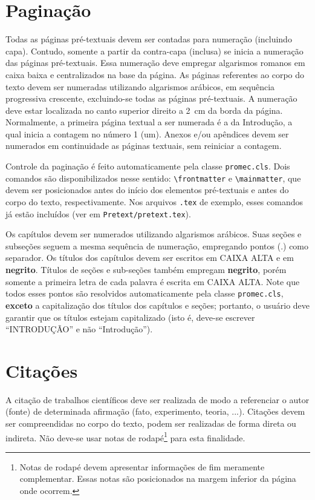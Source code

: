 \section{Paginação}
Todas as páginas pré-textuais devem ser contadas para numeração (incluindo capa). Contudo, somente a partir da contra-capa (inclusa) se inicia a numeração das páginas pré-textuais. Essa numeração deve empregar algarismos romanos em caixa baixa e centralizados na base da página. As páginas referentes ao corpo do texto devem ser numeradas utilizando algarismos arábicos, em sequência progressiva crescente, excluindo-se todas as páginas pré-textuais. A numeração deve estar localizada no canto superior direito a \SI{2}{\centi\meter} da borda da página. Normalmente, a primeira página textual a ser numerada é a da Introdução, a qual inicia a contagem no número \num{1} (um). Anexos e/ou apêndices devem ser numerados em continuidade as páginas textuais, sem reiniciar a contagem.

Controle da paginação é feito automaticamente pela classe \texttt{promec.cls}. Dois comandos são disponibilizados nesse sentido: \lstinline!\frontmatter! e \lstinline!\mainmatter!, que devem ser posicionados antes do início dos elementos pré-textuais e antes do corpo do texto, respectivamente. Nos arquivos \texttt{.tex} de exemplo, esses comandos já estão incluídos (ver em \texttt{Pretext/pretext.tex}).

Os capítulos devem ser numerados utilizando algarismos arábicos. Suas seções e subseções seguem a mesma sequência de numeração, empregando pontos (.) como separador. Os títulos dos capítulos devem ser escritos em CAIXA ALTA e em \textbf{negrito}. Títulos de seções e sub-seções também empregam \textbf{negrito}, porém somente a primeira letra de cada palavra é escrita em CAIXA ALTA. Note que todos esses pontos são resolvidos automaticamente pela classe \texttt{promec.cls}, \textbf{exceto} a capitalização dos títulos dos capítulos e seções; portanto, o usuário deve garantir que os títulos estejam capitalizado (isto é, deve-se escrever ``INTRODUÇÃO'' e não ``Introdução'').

\section{Citações}
A citação de trabalhos científicos deve ser realizada de modo a referenciar o autor (fonte) de determinada afirmação (fato, experimento, teoria, ...). Citações devem ser compreendidas no corpo do texto, podem ser realizadas de forma direta ou indireta. Não deve-se usar notas de rodapé\footnote{Notas de rodapé devem apresentar informações de fim meramente complementar. Essas notas são posicionados na margem inferior da página onde ocorrem.} para esta finalidade.


